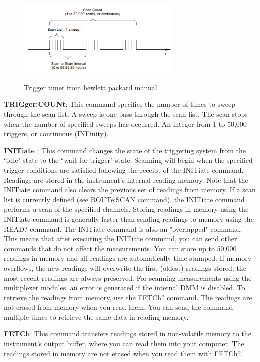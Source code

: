 \documentclass[a4paper]{article}
\begin{document}
\begin{figure}[h!]
	\centering
	\includegraphics[width=0.7\textwidth]{trigger_timer2.png}
	\label{fig:trigger_timer2}
	\caption{Trigger timer from hewlett packard manual}
\end{figure}



\textbf{TRIGger:COUNt}: This command specifies the number of times to sweep through the scan list. A sweep is one pass through the scan list. The scan stops when the number of specified sweeps has occurred. An integer from 1 to 50,000 triggers, or continuous (INFinity).

\textbf{INITiate} : This command changes the state of the triggering system from the ``idle" state to the ``wait-for-trigger" state. Scanning will begin when the specified trigger conditions are satisfied following the receipt of the INITiate command. Readings are stored in the instrument's internal reading memory. Note that the INITiate command also clears the previous set of readings from memory.
If a scan list is currently defined (see ROUTe:SCAN command), the INITiate command performs a scan of the specified channels.
Storing readings in memory using the INITiate command is generally faster than sending readings to memory using the READ? command. The INITiate command is also an "overlapped" command. This means that after executing the INITiate command, you can send other commands that do not affect the measurements.
You can store up to 50,000 readings in memory and all readings are automatically time stamped. If memory overflows, the new readings will overwrite the first (oldest) readings stored; the most recent readings are always preserved.
For scanning measurements using the multiplexer modules, an error is generated if the internal DMM is disabled.
To retrieve the readings from memory, use the FETCh? command.
The readings are not erased from memory when you read them.
You can send the command multiple times to retrieve the same data in reading memory.

\textbf{FETCh}: This command transfers readings stored in non-volatile memory to the instrument's output buffer, where you can read them into your computer. The readings stored in memory are not erased when you read them with FETCh?.
\end{document}
